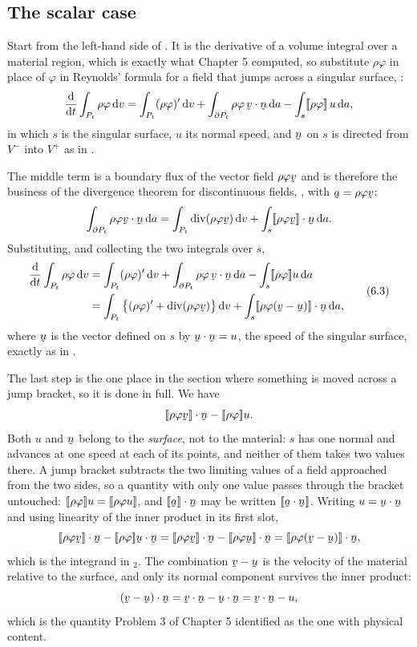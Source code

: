 \subsection*{The scalar case}

Start from the left-hand side of . It is the derivative of a
volume integral over a material region, which is exactly what
Chapter 5 computed, so substitute $\rho\varphi$ in place of $\varphi$
in Reynolds' formula for a field that jumps across a singular surface,
:
\[
   \frac{\dl}{\dl t}\int_{P_{t}}\rho\varphi\,\dl v
   =\int_{P_{t}}(\rho\varphi)'\,\dl v
   +\int_{\partial P_{t}}\rho\varphi\,\ip\bv\bn\,\dl a
   -\int_{s}\jump{\rho\varphi}\,u\,\dl a ,
\]
in which $s$ is the singular surface, $u$ its normal speed, and $\bn$
on $s$ is directed from $V^{-}$ into $V^{+}$ as in .

The middle term is a boundary flux of the vector field $\rho\varphi\bv$
and is therefore the business of the divergence theorem for
discontinuous fields, , with $\ba=\rho\varphi\bv$:
\[
   \int_{\partial P_{t}}\ip{\rho\varphi\bv}\bn\,\dl a
   =\int_{P_{t}}\dvg(\rho\varphi\bv)\,\dl v
   +\int_{s}\ip{\jump{\rho\varphi\bv}}\bn\,\dl a .
\]
Substituting, and collecting the two integrals over $s$,
\begin{equation}
\begin{aligned}
   \frac{\dl}{\dl t}\int_{P_{t}}\rho\varphi\,\dl v
   &=\int_{P_{t}}(\rho\varphi)'\,\dl v
    +\int_{\partial P_{t}}\rho\varphi\,\ip\bv\bn\,\dl a
    -\int_{s}\jump{\rho\varphi}u\,\dl a\\
   &=\int_{P_{t}}\big\{(\rho\varphi)'+\dvg(\rho\varphi\bv)\big\}\,\dl v
    +\int_{s}\ip{\jump{\rho\varphi(\bv-\bu)}}\bn\,\dl a ,
\end{aligned}
   \tag{6.3}\label{eq:6.3}
\end{equation}
where $\bu$ is the vector defined on $s$ by $\ip\bu\bn=u$, the speed of
the singular surface, exactly as in .

The last step is the one place in the section where something is moved
across a jump bracket, so it is done in full. We have
\[
   \ip{\jump{\rho\varphi\bv}}\bn-\jump{\rho\varphi}u .
\]
Both $u$ and $\bn$ belong to the \emph{surface}, not to the material:
$s$ has one normal and advances at one speed at each of its points, and
neither of them takes two values there. A jump bracket subtracts the
two limiting values of a field approached from the two sides, so a
quantity with only one value passes through the bracket untouched:
$[\![\rho\varphi]\!]u=[\![\rho\varphi u]\!]$, and $\ip{\jump\ba}\bn$ may
be written $\jump{\ip\ba\bn}$. Writing $u=\ip\bu\bn$ and using linearity of the
inner product in its first slot,
\[
   \ip{\jump{\rho\varphi\bv}}\bn-\jump{\rho\varphi}\ip\bu\bn
   =\ip{\jump{\rho\varphi\bv}}\bn-\ip{\jump{\rho\varphi\bu}}\bn
   =\ip{\jump{\rho\varphi(\bv-\bu)}}\bn ,
\]
which is the integrand in $_{2}$. The combination $\bv-\bu$ is
the velocity of the material relative to the surface, and only its
normal component survives the inner product:
\[
   \ip{(\bv-\bu)}\bn=\ip\bv\bn-\ip\bu\bn=\ip\bv\bn-u ,
\]
which is the quantity Problem 3 of Chapter 5 identified as the one with
physical content.

